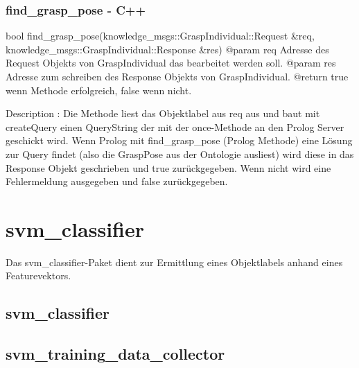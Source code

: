 \documentclass{suturo}
\begin{document}
\subsubsection{find\_grasp\_pose - C++}
\begin{spverbatim}
bool find_grasp_pose(knowledge_msgs::GraspIndividual::Request  &req, 
                             knowledge_msgs::GraspIndividual::Response &res)
@param req Adresse des Request Objekts von GraspIndividual das bearbeitet werden soll.
@param res Adresse zum schreiben des Response Objekts von GraspIndividual.
@return true wenn Methode erfolgreich, false wenn nicht.

Description : Die Methode liest das Objektlabel aus req aus und baut mit createQuery einen QueryString  der mit der once-Methode an den Prolog Server geschickt wird. Wenn Prolog mit find_grasp_pose (Prolog Methode) eine Lösung zur Query findet (also die GraspPose aus der Ontologie ausliest) wird diese in das Response Objekt 
geschrieben und true zurückgegeben. Wenn nicht wird eine Fehlermeldung ausgegeben und false zurückgegeben.
\end{spverbatim}

\section{svm\_classifier}
Das svm\_classifier-Paket dient zur Ermittlung eines Objektlabels anhand eines Featurevektors.

\subsection{svm\_classifier}
\begin{figure}[!htb]
\end{figure}

\subsection{svm\_training\_data\_collector}
\begin{figure}[!htb]
\end{figure}
\end{document}

